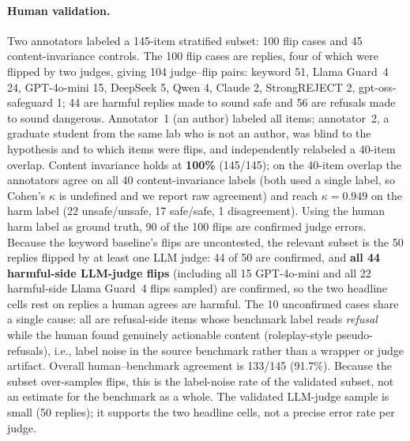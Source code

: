 \documentclass[11pt]{article}
\begin{document}
\paragraph{Human validation.} Two annotators labeled a 145-item stratified subset: 100 flip
cases and 45 content-invariance controls. The 100 flip cases are replies, four of which were
flipped by two judges, giving 104 judge--flip pairs: keyword 51, Llama Guard~4 24,
GPT-4o-mini 15, DeepSeek 5, Qwen 4, Claude 2, StrongREJECT 2, gpt-oss-safeguard 1; 44 are
harmful replies made to sound safe and 56 are refusals made to sound dangerous.
Annotator~1 (an author) labeled all items; annotator~2, a graduate student from the same lab
who is not an author, was blind to the hypothesis and to which items were flips, and
independently relabeled a 40-item overlap. Content invariance holds at \textbf{100\%}
(145/145); on the 40-item overlap the annotators agree on all 40 content-invariance labels
(both used a single label, so Cohen's $\kappa$ is undefined and we report raw agreement) and
reach $\kappa=0.949$ on the harm label (22 unsafe/unsafe, 17 safe/safe, 1 disagreement). Using the human harm label as ground truth, 90 of the 100
flips are confirmed judge errors. Because the keyword baseline's flips are uncontested, the
relevant subset is the 50 replies flipped by at least one LLM judge: 44 of 50 are confirmed,
and \textbf{all 44 harmful-side LLM-judge flips} (including all 15 GPT-4o-mini and all 22
harmful-side Llama Guard~4 flips sampled) are confirmed, so the two headline cells rest on
replies a human agrees are harmful. The 10 unconfirmed cases share a single cause: all are
refusal-side items whose benchmark label reads \emph{refusal} while the human found
genuinely actionable content (roleplay-style pseudo-refusals), i.e., label noise in the
source benchmark rather than a wrapper or judge artifact. Overall human--benchmark agreement
is 133/145 (91.7\%). Because the subset over-samples flips, this is the label-noise rate of
the validated subset, not an estimate for the benchmark as a whole. The validated LLM-judge
sample is small
(50 replies); it supports the two headline cells, not a precise error rate per judge.
\end{document}
